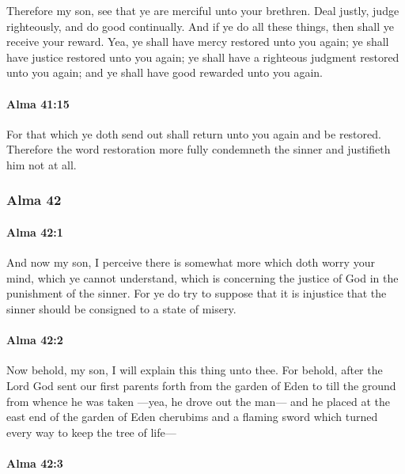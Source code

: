 			Therefore my son, see that ye are merciful unto your brethren.
			Deal justly, judge righteously, and do good continually.
			And if ye do all these things, then shall ye receive your reward.
			Yea, ye shall have mercy restored unto you again;
			ye shall have justice restored unto you again;
			ye shall have a righteous judgment restored unto you again;
			and ye shall have good rewarded unto you again.

		\paragraph{Alma 41:15} %
			\label{ALMA-41-15}

			For that which ye doth send out shall return unto you again and be restored.
			Therefore the word restoration more fully condemneth the sinner
			and justifieth him not at all.

	\subsubsection{Alma 42} %
		\label{ALMA-42}
		
		\paragraph{Alma 42:1} %
			\label{ALMA-42-1}

			And now my son, I perceive there is somewhat more
			which doth worry your mind, which ye cannot understand,
			which is concerning the justice of God in the punishment of the sinner.
			For ye do try to suppose that it is injustice
			that the sinner should be consigned to a state of misery.

		\paragraph{Alma 42:2} %
			\label{ALMA-42-2}

			Now behold, my son, I will explain this thing unto thee.
			For behold, after the Lord God sent our first parents forth from the garden of Eden
			to till the ground from whence he was taken
			---yea, he drove out the man---
			and he placed at the east end of the garden of Eden cherubims
			and a flaming sword which turned every way to keep the tree of life---

		\paragraph{Alma 42:3} %
			\label{ALMA-42-3}

